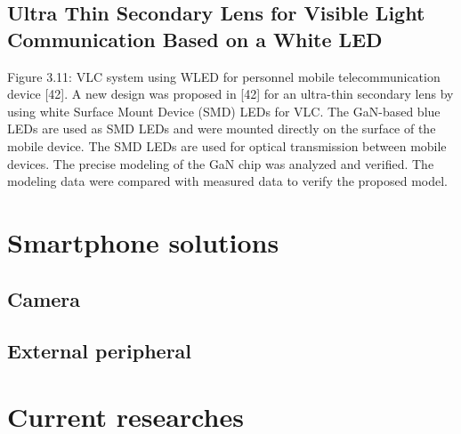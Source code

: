 \subsection{Ultra Thin Secondary Lens for Visible Light Communication Based on a White LED}
Figure 3.11: VLC system using WLED for personnel mobile telecommunication device
[42].
A new design was proposed in [42] for an ultra-thin secondary lens by using white
Surface Mount Device (SMD) LEDs for VLC. The GaN-based blue LEDs are used as
SMD LEDs and were mounted directly on the surface of the mobile device. The SMD
LEDs are used for optical transmission between mobile devices. The precise modeling of
the GaN chip was analyzed and verified. The modeling data were compared with
measured data to verify the proposed model. 



\section{Smartphone solutions}

\subsection{Camera}
\subsection{External peripheral}


\section{Current researches}